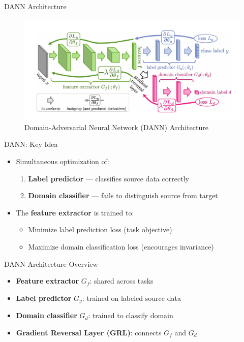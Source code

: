 \documentclass{beamer}
\begin{document}
\begin{frame}{DANN Architecture}
\begin{figure}
    \centering
    \includegraphics[width=0.9\linewidth]{DANN_img.png}
    \caption{Domain-Adversarial Neural Network (DANN) Architecture}
\end{figure}
\end{frame}

\begin{frame}{DANN: Key Idea}
\begin{itemize}
    \item Simultaneous optimization of:
    \begin{enumerate}
        \item \textbf{Label predictor} — classifies source data correctly
        \item \textbf{Domain classifier} — fails to distinguish source from target
    \end{enumerate}
    \item The \textbf{feature extractor} is trained to:
    \begin{itemize}
        \item Minimize label prediction loss (task objective)
        \item Maximize domain classification loss (encourages invariance)
    \end{itemize}
\end{itemize}
\end{frame}

\begin{frame}{DANN Architecture Overview}
\begin{itemize}
    \item \textbf{Feature extractor} $G_f$: shared across tasks
    \item \textbf{Label predictor} $G_y$: trained on labeled source data
    \item \textbf{Domain classifier} $G_d$: trained to classify domain
    \item \textbf{Gradient Reversal Layer (GRL)}: connects $G_f$ and $G_d$
\end{itemize}
\end{frame}
\end{document}
